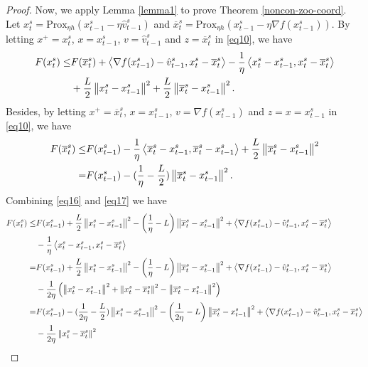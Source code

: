 \documentclass[iicol,sn-basic]{sn-jnl}
\theoremstyle{thmstyleone}%
\theoremstyle{thmstyletwo}%
\theoremstyle{thmstylethree}%
\newcommand*{\Po}{\text{Prox}}
\newcommand{\norm}[1]{\left\lVert#1\right\rVert}
\newcommand{\Iprod}[2]{\left\langle #1,#2\right\rangle}
\begin{document}
\begin{proof}
Now, we apply Lemma \ref{lemma1} to prove Theorem \ref{noncon-zoo-coord}. Let $x_t^s = \Po_{\eta h} (x_{t-1}^s - \eta \hat{v}_{t-1}^s)$ and $\overline{x}_t^s = \Po_{\eta h} (x_{t-1}^s - \eta \nabla f(x_{t-1}^s))$. By letting $x^+ = x_t^s$, $x = x_{t-1}^s$, $v = \hat{v}_{t-1}^s$ and $z = \overline{x}_t^s$ in \eqref{eq10}, we have
\begin{align}
F(x^s_t) \leq& F(\overline{x}_t^s) + \Iprod{\nabla f(x_{t-1}^s)-\hat{v}_{t-1}^s}{x_t^s-\overline{x}_t^s}-\frac{1}{\eta} \Iprod{x_t^s-x_{t-1}^s}{x_t^s-\overline{x}_t^s}\notag\\
&+\frac{L}{2}\norm{x_t^s-x_{t-1}^s}^2+\frac{L}{2}\norm{\overline{x}_t^s-x_{t-1}^s}^2.\label{eq16}
\end{align}
Besides, by letting $x^+ = \overline{x}_t^s$, $x = x_{t-1}^s$, $v = \nabla f(x_{t-1}^s)$ and $z = x = {x}_{t-1}^s$ in \eqref{eq10}, we have
\begin{align}
F(\overline{x}_t^s) \leq& F({x}_{t-1}^s) - \frac{1}{\eta}\Iprod{\overline{x}_t^s-x_{t-1}^s}{\overline{x}_t^s - x_{t-1}^s}+\frac{L}{2}\norm{\overline{x}_t^s-x_{t-1}^s}^2\notag\\
 =& F({x}_{t-1}^s) -(\frac{1}{\eta}-\frac{L}{2})\norm{\overline{x}_t^s-x_{t-1}^s}^2.\label{eq17} 
\end{align}
Combining \eqref{eq16} and \eqref{eq17} we have 
 \begin{align}
 F({x}_t^s) \leq& F({x}_{t-1}^s) +\frac{L}{2}\norm{{x}_t^s-x_{t-1}^s}^2 - \left(\frac{1}{\eta}-L\right)\norm{\overline{x}_t^s-x_{t-1}^s}^2+\Iprod{\nabla f(x_{t-1}^s)-\hat{v}_{t-1}^s}{x_t^s - \overline{x}_t^s}\notag\\
 & -\frac{1}{\eta} \Iprod{x_t^s-x_{t-1}^s}{x_t^s-\overline{x}_{t}^s}\notag\\
  =& F({x}_{t-1}^s)  +\frac{L}{2}\norm{{x}_t^s-x_{t-1}^s}^2- \left(\frac{1}{\eta}-L\right)\norm{\overline{x}_t^s-x_{t-1}^s}^2+\Iprod{\nabla f(x_{t-1}^s)-\hat{v}_{t-1}^s}{x_t^s - \overline{x}_t^s}\notag\\
 &-\frac{1}{2\eta} \left(\norm{x_t^s-x_{t-1}^s}^2+ \norm{x_t^s-\overline{x}_{t}^s}^2-\norm{\overline{x}_{t}^s-x_{t-1}^s}^2\right)\notag\\
   =& F({x}_{t-1}^s)  -(\frac{1}{2\eta} - \frac{L}{2})\norm{{x}_t^s-x_{t-1}^s}^2- \left(\frac{1}{2\eta}-L\right)\norm{\overline{x}_t^s-x_{t-1}^s}^2+\Iprod{\nabla f(x_{t-1}^s)-\hat{v}_{t-1}^s}{x_t^s - \overline{x}_t^s}\notag\\
 & -\frac{1}{2\eta} \norm{x_t^s-\overline{x}_{t}^s}^2\notag\\

\end{align}
\end{proof}
\end{document}

